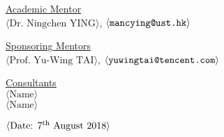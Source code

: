 \begin{center}
\vspace \shiftdownb
\underline {Academic Mentor} \\
\vspace{5pt}
$\langle \text{Dr. Ningchen YING}\rangle$, $\langle \text{\texttt{mancying@ust.hk}} \rangle$

\vspace \shiftdownb
\underline {Sponsoring Mentors}\\
\vspace{5pt}
$\langle \text{Prof. Yu-Wing TAI}\rangle$, $\langle \text{\texttt{yuwingtai@tencent.com}} \rangle$\\
\vspace{3pt}


\vspace \shiftdownb
\underline {Consultants}\\
\vspace{5pt}
$\langle \text{Name}\rangle$\\
\vspace{3pt}
$\langle \text{Name}\rangle$

\vspace \shiftdowna
$\langle \text{Date: $7^{\textnormal{th}}$ August 2018}\rangle$ 

\end{center}

 
